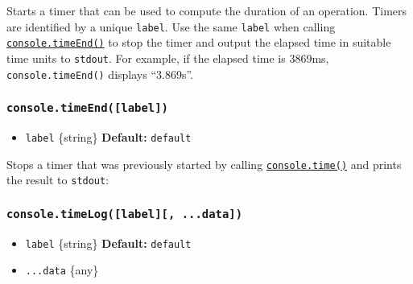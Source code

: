 Starts a timer that can be used to compute the duration of an operation.
Timers are identified by a unique \texttt{label}. Use the same
\texttt{label} when calling
\hyperref[consoletimeendlabel]{\texttt{console.timeEnd()}} to stop the
timer and output the elapsed time in suitable time units to
\texttt{stdout}. For example, if the elapsed time is 3869ms,
\texttt{console.timeEnd()} displays ``3.869s''.

\subsubsection{\texorpdfstring{\texttt{console.timeEnd({[}label{]})}}{console.timeEnd({[}label{]})}}\label{console.timeendlabel}

\begin{itemize}
\tightlist
\item
  \texttt{label} \{string\} \textbf{Default:}
  \texttt{\textquotesingle{}default\textquotesingle{}}
\end{itemize}

Stops a timer that was previously started by calling
\hyperref[consoletimelabel]{\texttt{console.time()}} and prints the
result to \texttt{stdout}:

\begin{Shaded}
\begin{Highlighting}[]
\NormalTok{(}\NormalTok{)}\OperatorTok{;}
\NormalTok{(}\NormalTok{)}\OperatorTok{;}
\end{Highlighting}
\end{Shaded}

\subsubsection{\texorpdfstring{\texttt{console.timeLog({[}label{]}{[},\ ...data{]})}}{console.timeLog({[}label{]}{[}, ...data{]})}}\label{console.timeloglabel-...data}

\begin{itemize}
\tightlist
\item
  \texttt{label} \{string\} \textbf{Default:}
  \texttt{\textquotesingle{}default\textquotesingle{}}
\item
  \texttt{...data} \{any\}
\end{itemize}

